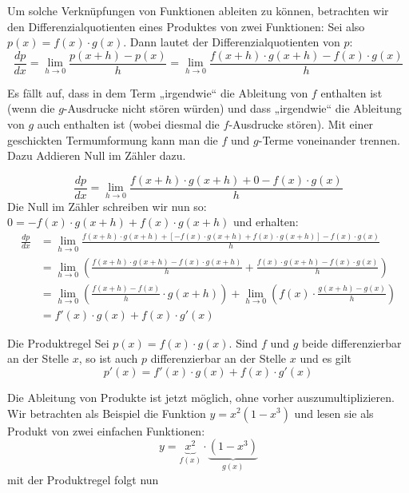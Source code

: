 Um solche Verknüpfungen von Funktionen ableiten zu können, betrachten wir den Differenzialquotienten eines Produktes von zwei Funktionen: Sei also $p(x)=f(x)\cdot g(x)$. Dann lautet der Differenzialquotienten von $p$:
$$\frac{dp}{dx}=\lim_{h\rightarrow 0} \frac{p(x+h)-p(x)}{h} = \lim_{h\rightarrow 0}\frac{f(x+h)\cdot g(x+h) - f(x)\cdot g(x)}{h}$$


Es fällt auf, dass in dem Term „irgendwie“ die Ableitung von $f$ enthalten ist (wenn die $g$-Ausdrucke nicht stören würden) und dass „irgendwie“ die Ableitung von $g$ auch enthalten ist (wobei diesmal die $f$-Ausdrucke stören). Mit einer geschickten Termumformung kann man die $f$ und $g$-Terme voneinander trennen. Dazu Addieren Null im Zähler dazu.

$$\frac{dp}{dx}=\lim_{h\rightarrow 0}\frac{f(x+h)\cdot g(x+h) + 0 - f(x)\cdot g(x)}{h}$$
Die Null im Zähler schreiben wir nun so: $0=-f(x)\cdot g(x+h)+f(x)\cdot g(x+h)$ und erhalten:
\begin{align*}
	\frac{dp}{dx} & = \lim_{h\rightarrow 0}\frac{f(x+h)\cdot g(x+h) + [-f(x)\cdot g(x+h)+f(x)\cdot g(x+h)] - f(x)\cdot g(x)}{h}                                  \\
	              & =  \lim_{h\rightarrow 0} \left(\frac{f(x+h)\cdot g(x+h)-f(x)\cdot g(x+h)}{h} + \frac{f(x)\cdot g(x+h)-f(x)\cdot g(x)}{h}\right)              \\
	              & = \lim_{h\rightarrow 0} \left(\frac{f(x+h)-f(x)}{h}\cdot g(x+h)\right) + \lim_{h\rightarrow 0} \left(f(x) \cdot \frac{g(x+h)-g(x)}{h}\right) \\
	              & =f'(x)\cdot g(x) + f(x)\cdot g'(x)
\end{align*}
\begin{satz}
	{Die Produktregel}{}
	Sei $p(x)=f(x)\cdot g(x)$. Sind $f$ und $g$ beide differenzierbar an der Stelle $x$, so ist auch $p$ differenzierbar an der Stelle $x$ und es gilt
	$$p'(x)=f'(x) \cdot g(x)+f(x)\cdot g' (x)$$

\end{satz}

\begin{bsp}
	{}{}
	Die Ableitung von Produkte ist jetzt möglich, ohne vorher auszumultiplizieren. Wir betrachten als Beispiel die Funktion $y=x^2(1-x^3)$ und lesen sie als Produkt von zwei einfachen Funktionen:
	$$y=\underbrace{x^2}_{f(x)} \cdot \underbrace{(1-x^3)}_{g(x)}$$
	mit der Produktregel folgt nun
	\vspace*{4cm}
\end{bsp}

